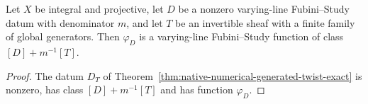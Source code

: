 \begin{corollary}
\label{cor:native-numerical-generated-twist-isfs}
\leanok
{}
Let $X$ be integral and projective, let $D$ be a nonzero varying-line
Fubini--Study datum with denominator $m$, and let $T$ be an invertible
sheaf with a finite family of global generators.  Then $\varphi_D$ is a
varying-line Fubini--Study function of class $[D]+m^{-1}[T]$.
\end{corollary}
\begin{proof}
The datum $D_T$ of Theorem~\ref{thm:native-numerical-generated-twist-exact}
is nonzero, has class $[D]+m^{-1}[T]$ and has function $\varphi_D$.
\end{proof}
